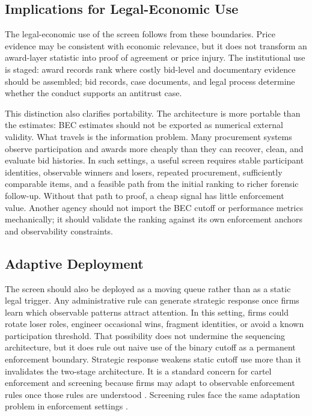 \subsection{Implications for Legal-Economic Use}
\label{sec:legal_economic_use_submission}

The legal-economic use of the screen follows from these
boundaries. Price evidence may be consistent with economic
relevance, but it does not transform an award-layer statistic
into proof of agreement or price injury. The institutional use is staged:
award records rank where costly bid-level and documentary
evidence should be assembled; bid records, case documents, and
legal process determine whether the conduct supports an antitrust
case.

This distinction also clarifies portability. The architecture is
more portable than the estimates: BEC estimates should not be
exported as numerical external validity. What travels is the
information problem. Many
procurement systems observe participation and awards more cheaply
than they can recover, clean, and evaluate bid histories. In such
settings, a useful screen requires stable participant identities,
observable winners and losers, repeated procurement, sufficiently
comparable items, and a feasible path from the initial ranking to
richer forensic follow-up. Without that path to proof, a cheap
signal has little enforcement value.
Another agency should not import the BEC cutoff or performance
metrics mechanically; it should validate the ranking against its
own enforcement anchors and observability constraints.

\subsection{Adaptive Deployment}
\label{sec:adaptive_deployment_submission}

The screen should also be deployed as a moving queue rather than
as a static legal trigger. Any administrative rule can
generate strategic response once firms learn which observable
patterns attract attention. In this setting, firms could rotate
loser roles, engineer occasional wins, fragment identities, or
avoid a known participation threshold. That possibility does not
undermine the sequencing architecture, but it does rule out naive
use of the binary cutoff as a permanent enforcement boundary.
Strategic response weakens static cutoff use more than it
invalidates the two-stage architecture. It is a standard concern
for cartel enforcement and screening because firms may adapt to
observable enforcement rules once those rules are understood
\citep{green1984noncooperative,haltiwanger1991the}. Screening
rules face the same adaptation problem in enforcement settings
\citep{harrington2008detecting,sanchezgraells2019screening}.


